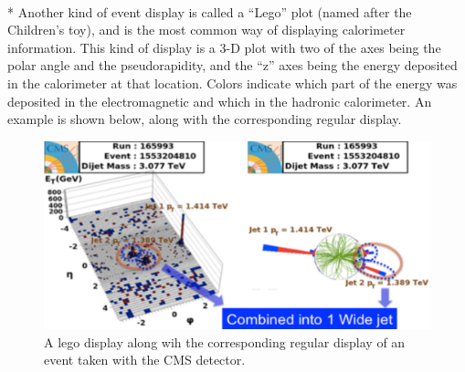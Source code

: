 \\*
Another kind of event display is called a ``Lego'' plot (named after the Children's toy), and is the most common way of displaying calorimeter information.  This kind of display is a 3-D plot with two of the axes being the polar angle and the pseudorapidity, and the ``z'' axes being the energy deposited in the calorimeter at that location. Colors indicate which part of the energy was deposited in the electromagnetic and which in the hadronic calorimeter. An example is shown below, along with the corresponding regular display.
\begin{figure}[h]
\centering\includegraphics[scale=0.5]{./particleID/Pictures/fig3.pdf}
\caption{A lego display along wih the corresponding regular display of an event taken with the CMS detector.}
\label{fig:pdgdedx}
\end{figure}

